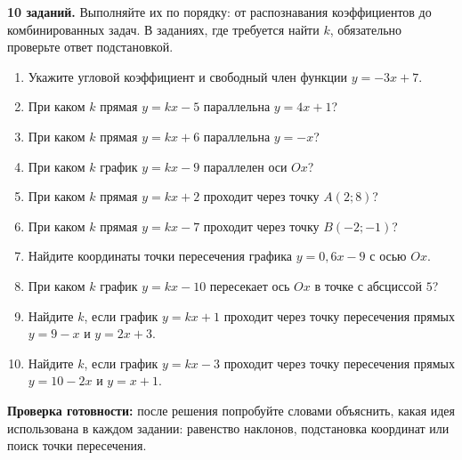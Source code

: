 \documentclass[a4paper,11pt]{article}
\newcommand{\topic}[1]{\vspace{7pt}{\color{darkaccent}\large\bfseries #1}\par\vspace{-4pt}{\color{accent}\rule{\linewidth}{0.45pt}}\par\vspace{3pt}}
\begin{document}
\clearpage
\topic{Тренировочный блок --- путь А}
\textbf{10 заданий.} Выполняйте их по порядку: от распознавания коэффициентов до комбинированных задач. В заданиях, где требуется найти \(k\), обязательно проверьте ответ подстановкой.
\vspace{3mm}
{
\begin{enumerate}[label=\textbf{\arabic*.},itemsep=8pt]
\item Укажите угловой коэффициент и свободный член функции \(y=-3x+7\).
\item При каком \(k\) прямая \(y=kx-5\) параллельна \(y=4x+1\)?
\item При каком \(k\) прямая \(y=kx+6\) параллельна \(y=-x\)?
\item При каком \(k\) график \(y=kx-9\) параллелен оси \(Ox\)?
\item При каком \(k\) прямая \(y=kx+2\) проходит через точку \(A(2;8)\)?
\item При каком \(k\) прямая \(y=kx-7\) проходит через точку \(B(-2;-1)\)?
\item Найдите координаты точки пересечения графика \(y=0{,}6x-9\) с осью \(Ox\).
\item При каком \(k\) график \(y=kx-10\) пересекает ось \(Ox\) в точке с абсциссой \(5\)?
\item Найдите \(k\), если график \(y=kx+1\) проходит через точку пересечения прямых \(y=9-x\) и \(y=2x+3\).
\item Найдите \(k\), если график \(y=kx-3\) проходит через точку пересечения прямых \(y=10-2x\) и \(y=x+1\).
\end{enumerate}
}
\vspace{4mm}
\textbf{Проверка готовности:} после решения попробуйте словами объяснить, какая идея использована в каждом задании: равенство наклонов, подстановка координат или поиск точки пересечения.
\end{document}
